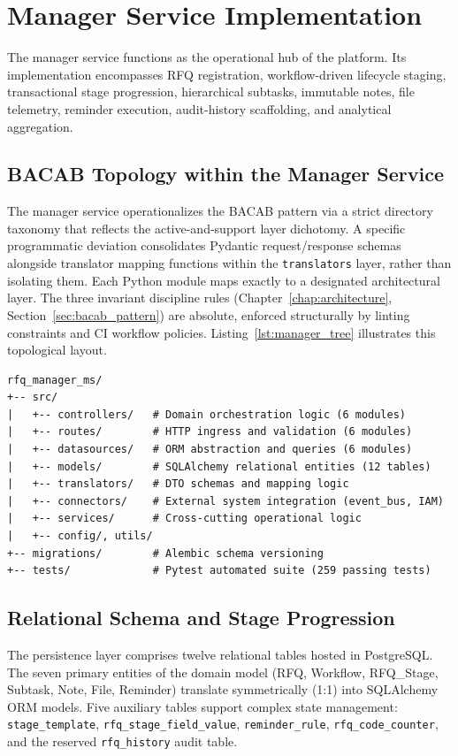 \section{Manager Service Implementation}\label{sec:manager_impl}
The manager service functions as the operational hub of the platform. Its implementation encompasses RFQ registration, workflow-driven lifecycle staging, transactional stage progression, hierarchical subtasks, immutable notes, file telemetry, reminder execution, audit-history scaffolding, and analytical aggregation.

\subsection{BACAB Topology within the Manager Service}\label{sec:manager_bacab}
The manager service operationalizes the BACAB pattern via a strict directory taxonomy that reflects the active-and-support layer dichotomy. A specific programmatic deviation consolidates Pydantic request/response schemas alongside translator mapping functions within the \texttt{translators} layer, rather than isolating them. Each Python module maps exactly to a designated architectural layer. The three invariant discipline rules (Chapter~\ref{chap:architecture}, Section~\ref{sec:bacab_pattern}) are absolute, enforced structurally by linting constraints and CI workflow policies. Listing~\ref{lst:manager_tree} illustrates this topological layout.

\begin{lstlisting}[basicstyle=\ttfamily\footnotesize, frame=single, captionpos=b, label={lst:manager_tree}, caption={Topological BACAB layout of \texttt{rfq\_manager\_ms} (depth 2)}]
rfq_manager_ms/
+-- src/
|   +-- controllers/   # Domain orchestration logic (6 modules)
|   +-- routes/        # HTTP ingress and validation (6 modules)
|   +-- datasources/   # ORM abstraction and queries (6 modules)
|   +-- models/        # SQLAlchemy relational entities (12 tables)
|   +-- translators/   # DTO schemas and mapping logic
|   +-- connectors/    # External system integration (event_bus, IAM)
|   +-- services/      # Cross-cutting operational logic
|   +-- config/, utils/
+-- migrations/        # Alembic schema versioning
+-- tests/             # Pytest automated suite (259 passing tests)
\end{lstlisting}

\subsection{Relational Schema and Stage Progression}\label{sec:db_schema}
The persistence layer comprises twelve relational tables hosted in PostgreSQL. The seven primary entities of the domain model (RFQ, Workflow, RFQ\_Stage, Subtask, Note, File, Reminder) translate symmetrically (1:1) into SQLAlchemy ORM models. Five auxiliary tables support complex state management: \texttt{stage\_template}, \texttt{rfq\_stage\_field\_value}, \texttt{reminder\_rule}, \texttt{rfq\_code\_counter}, and the reserved \texttt{rfq\_history} audit table.

